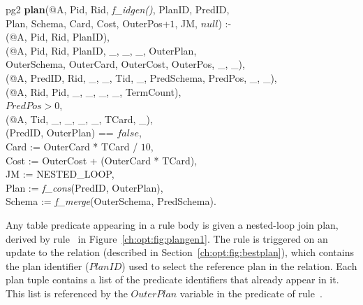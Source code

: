 \begin{figure*}
\ssp
\centering
\begin{boxedminipage}{\linewidth}
\linenumbers
pg2 {\bf plan}(@A, Pid, Rid, {\em f\_idgen()}, PlanID, PredID, \\
\datalogspace \xspace Plan, Schema, Card, Cost, OuterPos+$1$, JM, $null$) :-\\
(@A, Pid, Rid, PlanID),\\
(@A, Pid, Rid, PlanID, \_, \_, \_, OuterPlan, \\
\datalogspace \datalogspace OuterSchema, OuterCard, OuterCost, OuterPos, \_, \_),  \\   
(@A, PredID, Rid, \_, \_, Tid, \_, PredSchema, PredPos, \_, \_),\\
(@A, Rid, Pid, \_, \_, \_, \_, TermCount), \\
\datalogspace $PredPos > 0$,\\
(@A, Tid, \_, \_, \_, \_, TCard, \_),\\
(PredID, OuterPlan) == $false$,\\
\datalogspace Card := OuterCard * TCard / $10$,\\
\datalogspace Cost := OuterCost + (OuterCard * TCard),\\
\datalogspace JM := NESTED\_LOOP, \\
\datalogspace Plan := {\em f\_cons}(PredID, OuterPlan), \\
\datalogspace Schema := {\em f\_merge}(OuterSchema, PredSchema).\\
\end{boxedminipage}
\caption{\label{ch:opt:fig:plangen1}nested-loop join method.}
\end{figure*}

Any table predicate appearing in a rule body is given a nested-loop join plan,
derived by rule~ in Figure~\ref{ch:opt:fig:plangen1}.  The rule is
triggered on an update to the  relation (described in
Section~\ref{ch:opt:fig:bestplan}), which contains the plan identifier
($PlanID$) used to select the reference plan in the  relation.  Each
plan tuple contains a list of the predicate identifiers that already appear in
it.  This list is referenced by the $OuterPlan$ variable in the 
predicate of rule~.

